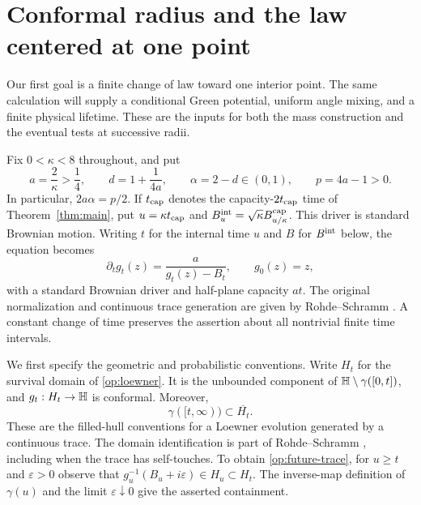 \section{Conformal radius and the law centered at one point}
\label{op:section}

Our first goal is a finite change of law toward one interior point.
The same calculation will supply a conditional Green potential, uniform
angle mixing, and a finite physical lifetime. These are the inputs for
both the mass construction and the eventual tests at successive radii.

Fix $0<\kappa<8$ throughout, and put
\begin{equation}
 a=\frac2\kappa>\frac14,\qquad d=1+\frac1{4a},\qquad
 \alpha=2-d\in(0,1),\qquad p=4a-1>0.
 \label{op:parameters}
\end{equation}
In particular, $2a\alpha=p/2$. If $t_{\rm cap}$ denotes the
capacity-$2t_{\rm cap}$ time of Theorem~\ref{thm:main}, put
$u=\kappa t_{\rm cap}$ and
$B^{\rm int}_u=\sqrt\kappa B^{\rm cap}_{u/\kappa}$.
This driver is standard Brownian motion. Writing $t$ for the internal
time $u$ and $B$ for $B^{\rm int}$ below, the equation becomes
\begin{equation}
 \partial_t g_t(z)=\frac{a}{g_t(z)-B_t},\qquad g_0(z)=z,
 \label{op:loewner}
\end{equation}
with a standard Brownian driver and half-plane capacity $at$.
The original normalization and continuous trace generation are given by
Rohde--Schramm \cite[Section~2.1 and Theorem~5.1]{RohdeSchramm2005}.
A constant change of time preserves the
assertion about all nontrivial finite time intervals.

We first specify the geometric and probabilistic conventions. Write $H_t$
for the survival domain of \eqref{op:loewner}. It is the unbounded component
of $\mathbb H\setminus\gamma([0,t])$, and $g_t:H_t\to\mathbb H$ is conformal.
Moreover,
\begin{equation}
 \gamma([t,\infty))\subset\overline{H_t}.
 \label{op:future-trace}
\end{equation}
These are the filled-hull conventions for a Loewner evolution generated
by a continuous trace. The domain identification is part of
Rohde--Schramm \cite[Theorem~5.1]{RohdeSchramm2005}, including when
the trace has self-touches. To obtain \eqref{op:future-trace}, for
$u\ge t$ and $\varepsilon>0$ observe that
$g_u^{-1}(B_u+i\varepsilon)\in H_u\subset H_t$.
The inverse-map definition of $\gamma(u)$ and the limit
$\varepsilon\downarrow0$ give the asserted containment.

